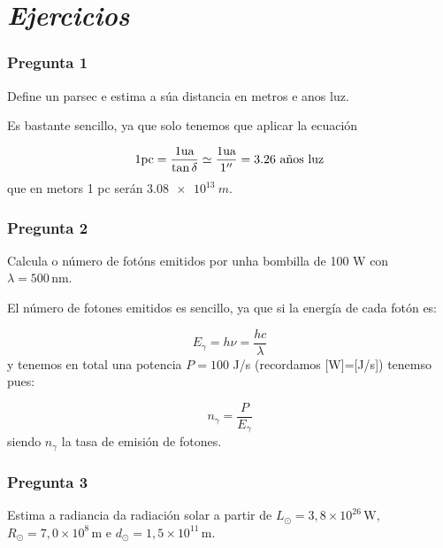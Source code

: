 

\newpage
\section*{\textit{Ejercicios}}

\begin{Enunciado}
	\subsubsection{Pregunta 1}

	Define un parsec e estima a súa distancia en metros e anos luz.

\end{Enunciado}

Es bastante sencillo, ya que solo tenemos que aplicar la ecuación 

\begin{equation*}
    1 \text{pc} = \frac{1\text{ua}}{\tan \delta} \simeq \frac{1 \text{ua}}{1''} = 3.26 \ \text{años luz}
\end{equation*}
que en metors 1 pc serán $\SI{3.08e+13}{m}$.

\vspace*{2em}

\begin{Enunciado}
	\subsubsection{Pregunta 2}

	Calcula o número de fotóns emitidos por unha bombilla de 100 W con $\lambda = 500\,\text{nm}$.

\end{Enunciado}

El número de fotones emitidos es sencillo, ya que si la energía de cada fotón es:

\begin{equation*}
    E_\gamma = h \nu = \frac{h c}{\lambda}
\end{equation*}
y tenemos en total una potencia $P=100$ J/s (recordamos [W]=[J/s]) tenemso pues:

\begin{equation}
    n_{\gamma} = \frac{P}{E_\gamma}
\end{equation}
siendo $n_{\gamma}$ la tasa de emisión de fotones.


\vspace*{2em}

\begin{Enunciado}
	\subsubsection{Pregunta 3}

	Estima a radiancia da radiación solar a partir de $L_\odot = 3{,}8 \times 10^{26}\,\text{W}$, $R_\odot = 7{,}0 \times 10^8\,\text{m}$ e $d_\odot = 1{,}5 \times 10^{11}\,\text{m}$.

\end{Enunciado}

